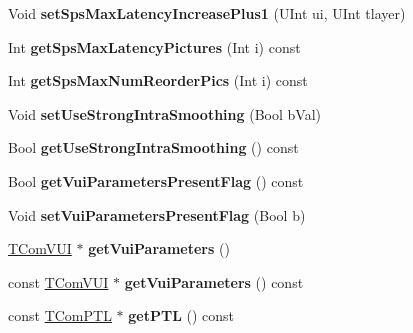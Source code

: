 \begin{DoxyCompactItemize}
\item 
\mbox{\label{class_t_com_s_p_s_a2b349516967fb8e01c21f2b15ae15f96}} 
Void {\bfseries set\+Sps\+Max\+Latency\+Increase\+Plus1} (U\+Int ui, U\+Int tlayer)
\item 
\mbox{\label{class_t_com_s_p_s_a38d5a583de5683dd495e4c7da63eee27}} 
Int {\bfseries get\+Sps\+Max\+Latency\+Pictures} (Int i) const
\item 
\mbox{\label{class_t_com_s_p_s_a642f66f833b7af05cc189efec6c1beb2}} 
Int {\bfseries get\+Sps\+Max\+Num\+Reorder\+Pics} (Int i) const
\item 
\mbox{\label{class_t_com_s_p_s_ab4f873f69744fbc738849765c74b0130}} 
Void {\bfseries set\+Use\+Strong\+Intra\+Smoothing} (Bool b\+Val)
\item 
\mbox{\label{class_t_com_s_p_s_aab23e68f385f1d3294b1c4e16c0b04ad}} 
Bool {\bfseries get\+Use\+Strong\+Intra\+Smoothing} () const
\item 
\mbox{\label{class_t_com_s_p_s_a229be9bbff63cfe0162fe4e2109d182f}} 
Bool {\bfseries get\+Vui\+Parameters\+Present\+Flag} () const
\item 
\mbox{\label{class_t_com_s_p_s_a2014d621d670f7a43c6be32227f9b533}} 
Void {\bfseries set\+Vui\+Parameters\+Present\+Flag} (Bool b)
\item 
\mbox{\label{class_t_com_s_p_s_a132f47f6403fe30dd1906234b0766ae6}} 
\hyperlink{class_t_com_v_u_i}{T\+Com\+V\+UI} $\ast$ {\bfseries get\+Vui\+Parameters} ()
\item 
\mbox{\label{class_t_com_s_p_s_a16ea6ce522968d759f046f42ddf853ca}} 
const \hyperlink{class_t_com_v_u_i}{T\+Com\+V\+UI} $\ast$ {\bfseries get\+Vui\+Parameters} () const
\item 
\mbox{\label{class_t_com_s_p_s_aeea0e0b664729f0a569f4b58e8d9bf6b}} 
const \hyperlink{class_t_com_p_t_l}{T\+Com\+P\+TL} $\ast$ {\bfseries get\+P\+TL} () const
\item 
\mbox{\label{class_t_com_s_p_s_a17fa3c81b8cf900006540da552763c98}} 

\end{DoxyCompactItemize}
